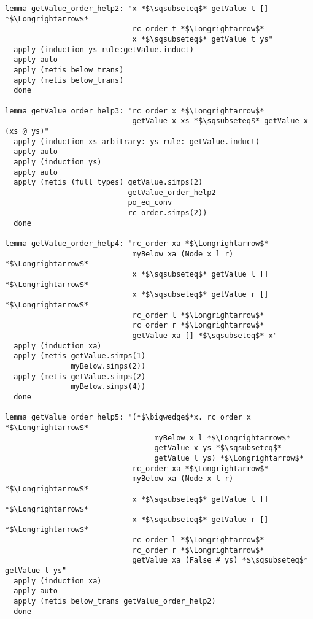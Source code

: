 \begin{lstlisting}[language=Isabelle]
lemma getValue_order_help2: "x *$\sqsubseteq$* getValue t [] *$\Longrightarrow$* 
                             rc_order t *$\Longrightarrow$* 
                             x *$\sqsubseteq$* getValue t ys"
  apply (induction ys rule:getValue.induct)
  apply auto
  apply (metis below_trans)
  apply (metis below_trans)
  done

lemma getValue_order_help3: "rc_order x *$\Longrightarrow$* 
                             getValue x xs *$\sqsubseteq$* getValue x (xs @ ys)"
  apply (induction xs arbitrary: ys rule: getValue.induct)
  apply auto  
  apply (induction ys)
  apply auto
  apply (metis (full_types) getValue.simps(2) 
                            getValue_order_help2 
                            po_eq_conv 
                            rc_order.simps(2))
  done

lemma getValue_order_help4: "rc_order xa *$\Longrightarrow$*
                             myBelow xa (Node x l r) *$\Longrightarrow$*
                             x *$\sqsubseteq$* getValue l [] *$\Longrightarrow$*
                             x *$\sqsubseteq$* getValue r [] *$\Longrightarrow$* 
                             rc_order l *$\Longrightarrow$* 
                             rc_order r *$\Longrightarrow$* 
                             getValue xa [] *$\sqsubseteq$* x"
  apply (induction xa)
  apply (metis getValue.simps(1) 
               myBelow.simps(2))
  apply (metis getValue.simps(2) 
               myBelow.simps(4))
  done

lemma getValue_order_help5: "(*$\bigwedge$*x. rc_order x *$\Longrightarrow$* 
                                  myBelow x l *$\Longrightarrow$* 
                                  getValue x ys *$\sqsubseteq$* 
                                  getValue l ys) *$\Longrightarrow$*
                             rc_order xa *$\Longrightarrow$*
                             myBelow xa (Node x l r) *$\Longrightarrow$*
                             x *$\sqsubseteq$* getValue l [] *$\Longrightarrow$*
                             x *$\sqsubseteq$* getValue r [] *$\Longrightarrow$*
                             rc_order l *$\Longrightarrow$* 
                             rc_order r *$\Longrightarrow$* 
                             getValue xa (False # ys) *$\sqsubseteq$* getValue l ys"
  apply (induction xa)
  apply auto
  apply (metis below_trans getValue_order_help2)
  done


\end{lstlisting}
